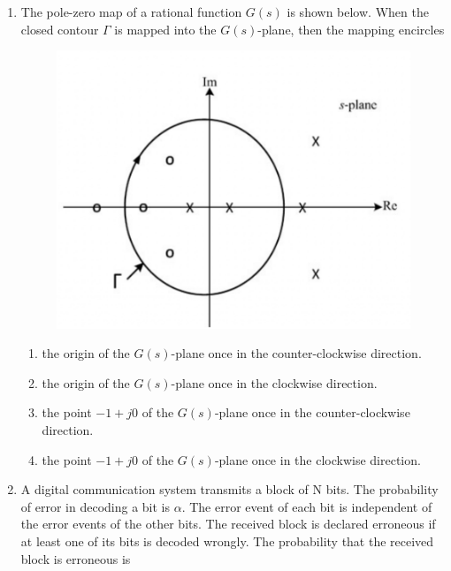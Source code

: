 \documentclass[a4paper, 11pt]{article}
\begin{document}
\begin{enumerate}
    \hfill{}

    \item The pole-zero map of a rational function $G(s)$ is shown below. When the closed contour $\Gamma$ is mapped into the $G(s)$-plane, then the mapping encircles
    \begin{figure}[H]
        \centering
        \includegraphics[width=0.4\columnwidth]{figs/Q11.png}
        \caption*{}
        \label{fig:q21}
    \end{figure}
    \begin{enumerate}
        \item the origin of the $G(s)$-plane once in the counter-clockwise direction.
        \item the origin of the $G(s)$-plane once in the clockwise direction.
        \item the point $-1+j0$ of the $G(s)$-plane once in the counter-clockwise direction.
        \item the point $-1+j0$ of the $G(s)$-plane once in the clockwise direction.
    \end{enumerate}

    \hfill{}

    \item A digital communication system transmits a block of N bits. The probability of error in decoding a bit is $\alpha$. The error event of each bit is independent of the error events of the other bits. The received block is declared erroneous if at least one of its bits is decoded wrongly. The probability that the received block is erroneous is
    \begin{enumerate}
    \end{enumerate}
    

\end{enumerate}
\end{document}

